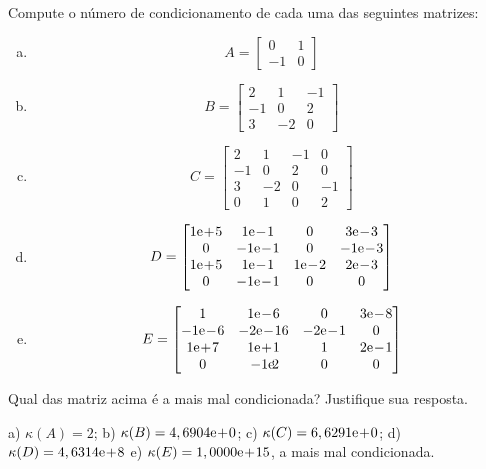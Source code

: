\begin{exer}
  Compute o número de condicionamento de cada uma das seguintes matrizes:
  \begin{enumerate}[a)]
  \item
    \begin{equation}
      A =
      \begin{bmatrix}
        0 & 1\\
        -1 & 0
      \end{bmatrix}
    \end{equation}
  \item 
    \begin{equation}
      B =
      \begin{bmatrix}
        2 & 1 & -1\\
        -1 & 0 & 2\\
        3 & -2 & 0
      \end{bmatrix}
    \end{equation}
  \item 
    \begin{equation}
      C =
      \begin{bmatrix}
        2 & 1 & -1 & 0\\
        -1 & 0 & 2 & 0\\
        3 & -2 & 0 & -1\\
        0 & 1 & 0 & 2
      \end{bmatrix}
    \end{equation}
  \item
    \begin{equation}
      D =
      \begin{bmatrix}
        1\E+5 & 1\E-1 & 0 & 3\E-3\\
        0 & -1\E-1 & 0 & -1\E-3\\
        1\E+5 & 1\E-1 & 1\E-2 & 2\E-3\\
        0 & -1\E-1 & 0 & 0
      \end{bmatrix}
    \end{equation}
    \item
      \begin{equation}
        E =
        \begin{bmatrix}
          1 & 1\E-6 & 0 & 3\E-8 \\
          -1\E-6 & -2\E-16 & -2\E-1 & 0\\
          1\E+7 & 1\E+1 & 1 & 2\E-1 \\
          0 & -1\E2 & 0 & 0
      \end{bmatrix}
    \end{equation}
  \end{enumerate}
  Qual das matriz acima é a mais mal condicionada? Justifique sua resposta.
\end{exer}
\begin{resp}
  a) $\kappa(A) = 2$; b) $\kappa(B) = 4,6904\mathrm{e}\!+\!0$; c) $\kappa(C) = 6,6291\mathrm{e}\!+\!0$; d) $\kappa(D) = 4,6314\mathrm{e}\!+\!8$ e) $\kappa(E) = 1,0000\mathrm{e}\!+\!15$, a mais mal condicionada.
\end{resp}

